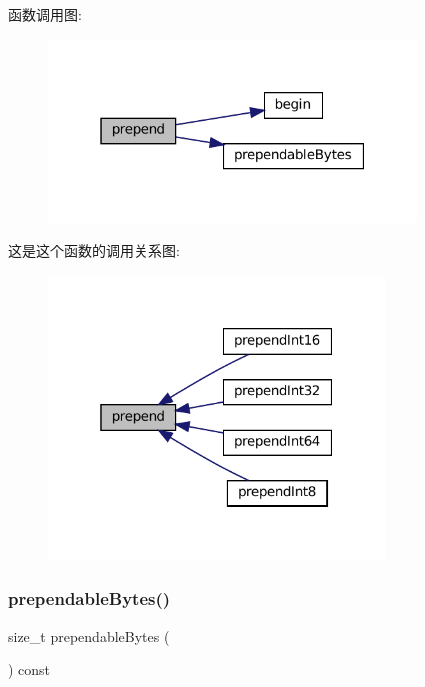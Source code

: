 函数调用图\+:
\nopagebreak
\begin{figure}[H]
\begin{center}
\leavevmode
\includegraphics[width=277pt]{classmuduo_1_1net_1_1Buffer_a3099092e4d4138f55fb825a50f50f24b_cgraph}
\end{center}
\end{figure}
这是这个函数的调用关系图\+:
\nopagebreak
\begin{figure}[H]
\begin{center}
\leavevmode
\includegraphics[width=253pt]{classmuduo_1_1net_1_1Buffer_a3099092e4d4138f55fb825a50f50f24b_icgraph}
\end{center}
\end{figure}
\mbox{\label{classmuduo_1_1net_1_1Buffer_ad738bbd8321f518ca5cdfac842993d04}} 
\subsubsection{\texorpdfstring{prependable\+Bytes()}{prependableBytes()}}
{\footnotesize\ttfamily size\+\_\+t prependable\+Bytes (\begin{DoxyParamCaption}{ }\end{DoxyParamCaption}) const\hspace{0.3cm}{\ttfamily [inline]}}



